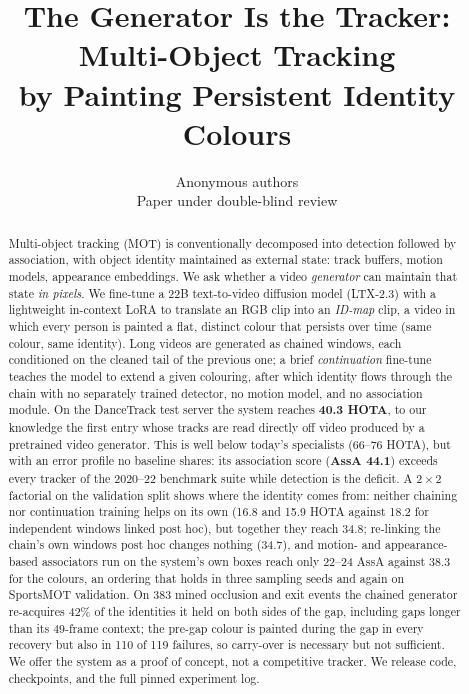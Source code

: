 \documentclass{article} %
\title{The Generator Is the Tracker: Multi-Object Tracking\\by Painting Persistent Identity Colours}
\author{Anonymous authors\\
Paper under double-blind review}
\newcommand{\rev}[1]{{\color{blue}#1}}
\begin{document}
\maketitle

\begin{abstract}
Multi-object tracking (MOT) is conventionally decomposed into detection followed by
association, with object identity maintained as external state: track buffers, motion
models, appearance embeddings. We ask whether a video \emph{generator} can maintain that
state \emph{in pixels}. We fine-tune a 22B text-to-video diffusion model (LTX-2.3) with a
lightweight in-context LoRA to translate an RGB clip into an \emph{ID-map} clip, a video in
which every person is painted a flat, distinct colour that persists over time (same
colour, same identity). Long videos are generated as chained windows, each conditioned on
the cleaned tail of the previous one; a brief \emph{continuation} fine-tune teaches the
model to extend a given colouring, after which identity flows through the chain with no
separately trained detector, no motion model, and no association module. On the DanceTrack
test server the system reaches \textbf{40.3 HOTA}, to our knowledge the first entry whose
tracks are read directly off video produced by a pretrained video generator. This is well
below today's specialists (66--76 HOTA), but with an error profile no baseline shares: its
association score (\textbf{AssA 44.1}) exceeds every tracker of the 2020--22 benchmark
suite while detection is the deficit. \rev{A $2\times2$ factorial} on the
validation split shows where the identity comes from: \rev{neither chaining nor continuation
training helps on its own (16.8 and 15.9 HOTA against 18.2 for independent windows linked
post hoc), but together they reach 34.8}; re-linking the chain's own windows post hoc changes
nothing (34.7), and motion- and appearance-based associators run on the system's own boxes
reach only 22--24 AssA \rev{against 38.3 for the colours}, an ordering that holds \rev{in three sampling
seeds and} again on SportsMOT validation. On 383 mined occlusion \rev{and exit} events the chained
generator re-acquires 42\% of the identities it held on both sides of the gap, including
gaps longer than its 49-frame context\rev{; the pre-gap colour is painted during the gap in
every recovery but also in 110 of 119 failures, so carry-over is necessary but not
sufficient. We offer the system as a proof of concept, not a competitive tracker}. We
release code, checkpoints, and the full pinned experiment log.
\end{abstract}
\end{document}
